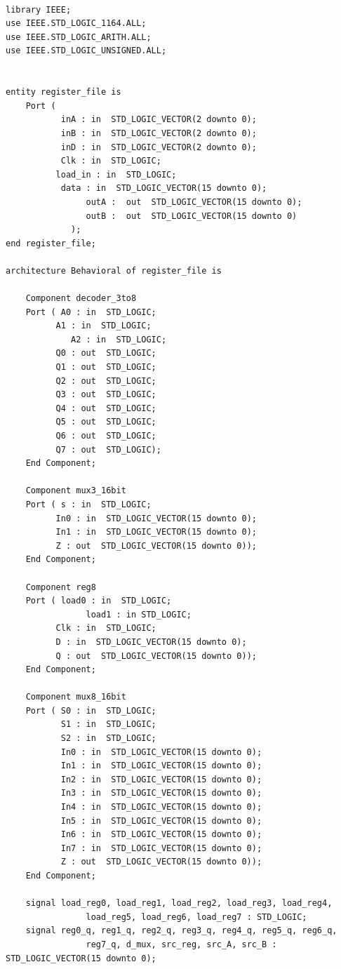 \documentclass{article}
\begin{document}
\begin{lstlisting}

library IEEE;
use IEEE.STD_LOGIC_1164.ALL;
use IEEE.STD_LOGIC_ARITH.ALL;
use IEEE.STD_LOGIC_UNSIGNED.ALL;


entity register_file is
    Port ( 
           inA : in  STD_LOGIC_VECTOR(2 downto 0);
           inB : in  STD_LOGIC_VECTOR(2 downto 0);
           inD : in  STD_LOGIC_VECTOR(2 downto 0);
           Clk : in  STD_LOGIC;
          load_in : in  STD_LOGIC;
           data : in  STD_LOGIC_VECTOR(15 downto 0);
				outA :  out  STD_LOGIC_VECTOR(15 downto 0);
				outB :  out  STD_LOGIC_VECTOR(15 downto 0)
			 );
end register_file;

architecture Behavioral of register_file is

	Component decoder_3to8
	Port ( A0 : in  STD_LOGIC;
          A1 : in  STD_LOGIC;
			 A2 : in  STD_LOGIC;
          Q0 : out  STD_LOGIC;
          Q1 : out  STD_LOGIC;
          Q2 : out  STD_LOGIC;
          Q3 : out  STD_LOGIC;
          Q4 : out  STD_LOGIC;
          Q5 : out  STD_LOGIC;
          Q6 : out  STD_LOGIC;
          Q7 : out  STD_LOGIC);
	End Component;

	Component mux3_16bit
	Port ( s : in  STD_LOGIC;
          In0 : in  STD_LOGIC_VECTOR(15 downto 0);
          In1 : in  STD_LOGIC_VECTOR(15 downto 0);
          Z : out  STD_LOGIC_VECTOR(15 downto 0));
	End Component;
	
	Component reg8
	Port ( load0 : in  STD_LOGIC;
				load1 : in STD_LOGIC;
          Clk : in  STD_LOGIC;
          D : in  STD_LOGIC_VECTOR(15 downto 0);
          Q : out  STD_LOGIC_VECTOR(15 downto 0));
	End Component;
	
	Component mux8_16bit
	Port ( S0 : in  STD_LOGIC;
           S1 : in  STD_LOGIC;
           S2 : in  STD_LOGIC;
           In0 : in  STD_LOGIC_VECTOR(15 downto 0);
           In1 : in  STD_LOGIC_VECTOR(15 downto 0);
           In2 : in  STD_LOGIC_VECTOR(15 downto 0);
           In3 : in  STD_LOGIC_VECTOR(15 downto 0);
           In4 : in  STD_LOGIC_VECTOR(15 downto 0);
           In5 : in  STD_LOGIC_VECTOR(15 downto 0);
           In6 : in  STD_LOGIC_VECTOR(15 downto 0);
           In7 : in  STD_LOGIC_VECTOR(15 downto 0);
           Z : out  STD_LOGIC_VECTOR(15 downto 0));
	End Component;
	
	signal load_reg0, load_reg1, load_reg2, load_reg3, load_reg4,
				load_reg5, load_reg6, load_reg7 : STD_LOGIC;
	signal reg0_q, reg1_q, reg2_q, reg3_q, reg4_q, reg5_q, reg6_q,
				reg7_q, d_mux, src_reg, src_A, src_B : STD_LOGIC_VECTOR(15 downto 0);


\end{lstlisting}
\end{document}

